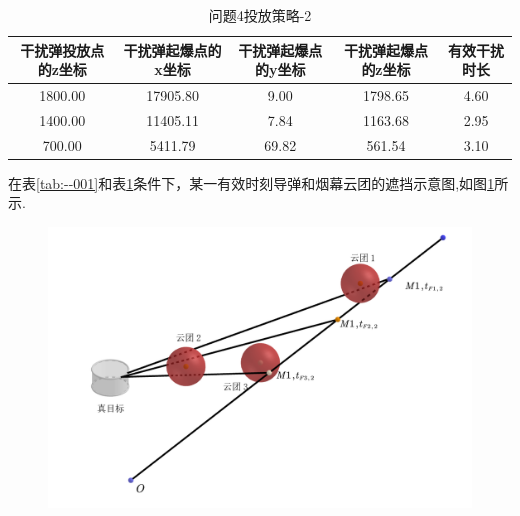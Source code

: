 \documentclass[../main.tex]{subfiles}
\begin{document}
\begin{table}[H]
\caption{问题4投放策略-2}
\label{tab:---031} 
\centering
\begin{small}
\begin{tabular}{ccccc}
\toprule[1.5pt]
    干扰弹投放点的z坐标 &干扰弹起爆点的x坐标&干扰弹起爆点的y坐标&干扰弹起爆点的z坐标&有效干扰时长\\
\midrule[1pt]
1800.00             & 17905.80                 & 9.00     & 1798.65                    & 4.60  \\               
1400.00             & 11405.11                 & 7.84     & 1163.68                    & 2.95  \\               
700.00              & 5411.79                  & 69.82    & 561.54                    & 3.10  \\                
\bottomrule[1.5pt]
\end{tabular}
\end{small}
\end{table}

在表\ref{tab:--001}和表\ref{tab:---031}条件下，某一有效时刻导弹和烟幕云团的遮挡示意图,如图\ref{图----3}所示.

\begin{figure}[H]
\centering
\includegraphics[scale=0.5]{图三.png}
\caption{}
\label{图----3}
\end{figure}
\end{document}

